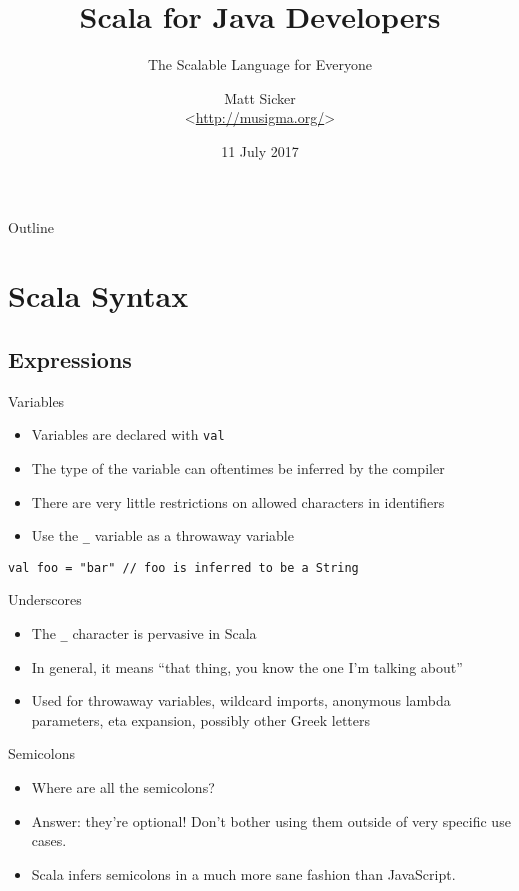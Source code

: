 \documentclass{beamer}
\title{Scala for Java Developers}
\subtitle{The Scalable Language for Everyone}
\author[Matt Sicker @jvz]{Matt Sicker \\ <\url{http://musigma.org/}>}
\institute{SPR Consulting}
\date{11 July 2017}
\begin{document}
\lstset{language=Scala}

\begin{frame}
  \titlepage
\end{frame}

\begin{frame}{Outline}
  \tableofcontents
\end{frame}

\section{Scala Syntax}

\subsection{Expressions}

\begin{frame}[fragile]{Variables}
\begin{itemize}
\item Variables are declared with \lstinline{val}
\item The type of the variable can oftentimes be inferred by the compiler
\item There are very little restrictions on allowed characters in identifiers
\item Use the \lstinline{_} variable as a throwaway variable
\end{itemize}
\begin{lstlisting}
val foo = "bar" // foo is inferred to be a String
\end{lstlisting}
\end{frame}

\begin{frame}{Underscores}
\begin{itemize}
\item The \lstinline{_} character is pervasive in Scala
\item In general, it means ``that thing, you know the one I'm talking about''
\item Used for throwaway variables, wildcard imports, anonymous lambda parameters,
eta expansion, possibly other Greek letters
\end{itemize}
\end{frame}

\begin{frame}{Semicolons}
\begin{itemize}
\item Where are all the semicolons?
\item Answer: they're optional! Don't bother using them outside of very specific use cases.
\item Scala infers semicolons in a much more sane fashion than JavaScript.
\end{itemize}
\end{frame}
\end{document}
